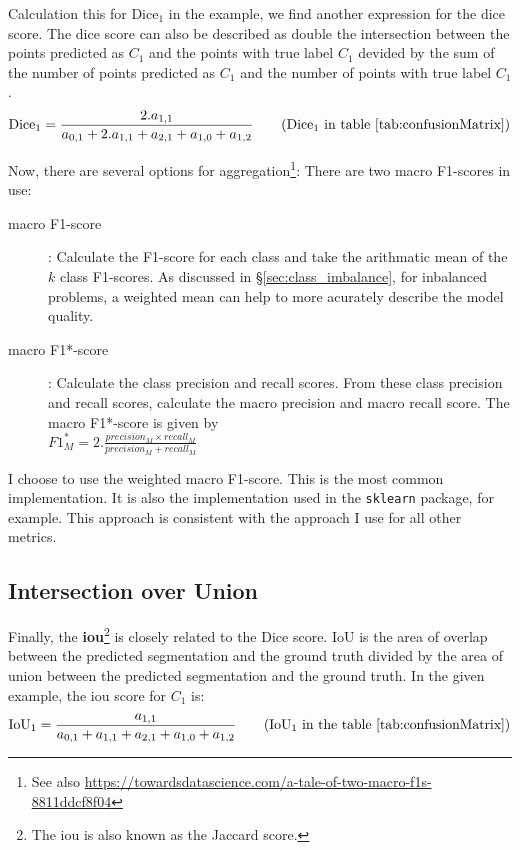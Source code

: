Calculation this for Dice$_1$ in the example, we find another expression for the dice score.
The dice score can also be described as double the intersection between the points predicted as $C_1$ and the points with true label $C_1$ devided by the sum of the number of points predicted as $C_1$ and the number of points with true label $C_1$.
\begin{equation}
    \text{Dice}_1 = \frac{2.a_{1,1}}{a_{0,1} + 2.a_{1,1} + a_{2, 1} + a_{1,0} + a_{1,2}} \tag{Dice$_1$ in table \ref{tab:confusionMatrix}}
\end{equation}

Now, there are several options for aggregation\footnote{See also \url{https://towardsdatascience.com/a-tale-of-two-macro-f1s-8811ddcf8f04}}:
There are two macro F1-scores in use:
\begin{description}
    \item[macro F1-score]: Calculate the F1-score for each class and take the arithmatic mean of the $k$ class F1-scores. As discussed in §\ref{sec:class_imbalance}, for inbalanced problems, a weighted mean can help to more acurately describe the model quality.
    \item[macro F1*-score]: Calculate the class precision and recall scores. From these class precision and recall scores, calculate the macro precision and macro recall score. 
    The macro F1*-score is given by\\ $F1_M^*=2 . \frac{precision_M \times recall_M }{precision_M + recall_M }$
\end{description}

I choose to use the weighted macro F1-score. This is the most common implementation. It is also the implementation used in the \texttt{sklearn} package, for example.
This approach is consistent with the approach I use for all other metrics. \\

\subsection{Intersection over Union}

Finally, the \textbf{\acrfull{iou}}\footnote{The \acrshort{iou} is also known as the Jaccard score.} is closely related to the Dice score.
IoU is the area of overlap between the predicted segmentation and the ground truth divided by the area of union between the predicted segmentation and the ground truth.
In the given example, the \acrshort{iou} score for $C_1$ is:
\begin{equation}
    \text{IoU}_1 = \frac{a_{1,1}}{a_{0,1}+a_{1,1}+a_{2,1}+a_{1,0}+a_{1,2}} \tag{IoU$_1$ in the table \ref{tab:confusionMatrix}}
\end{equation}

